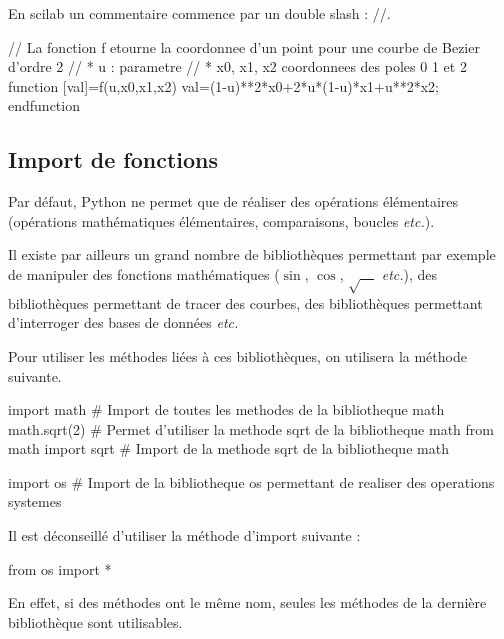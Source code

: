 \documentclass[11pt,oneside]{article}
\begin{document}
\begin{sci}

En scilab un commentaire commence par un double slash : //. 

\begin{scilab}
// La fonction f etourne la coordonnee d'un point pour une courbe de Bezier d'ordre 2
//     * u : parametre 
//     * x0, x1, x2 coordonnees des poles 0 1 et 2
function [val]=f(u,x0,x1,x2)
  val=(1-u)**2*x0+2*u*(1-u)*x1+u**2*x2;
endfunction
\end{scilab}
\end{sci}

\subsection{Import de fonctions}

Par défaut, Python ne permet que de réaliser des opérations élémentaires (opérations mathématiques élémentaires, comparaisons, boucles \textit{etc.}). 

Il existe par ailleurs un grand nombre de bibliothèques permettant par exemple de manipuler des fonctions mathématiques ($\sin$, $\cos$, $\sqrt{\quad}$ \textit{etc.}), des bibliothèques permettant de tracer des courbes, des bibliothèques permettant d'interroger des bases de données \textit{etc.}

Pour utiliser les méthodes liées à ces bibliothèques, on utilisera la méthode suivante. 

\begin{exemple}
\begin{py}
\begin{python}
import math  # Import de toutes les methodes de la bibliotheque math
math.sqrt(2) # Permet d'utiliser la methode sqrt de la bibliotheque math
from math import sqrt # Import de la methode sqrt de la bibliotheque math

import os # Import de la bibliotheque os permettant de realiser des operations systemes
\end{python}
\end{py} 
\end{exemple}

\begin{warn}
Il est déconseillé d'utiliser la méthode d'import suivante : 
\begin{python}
from os import *
\end{python}

En effet, si des méthodes ont le même nom, seules les méthodes de la dernière bibliothèque sont utilisables. 
\end{warn}
\end{document}
